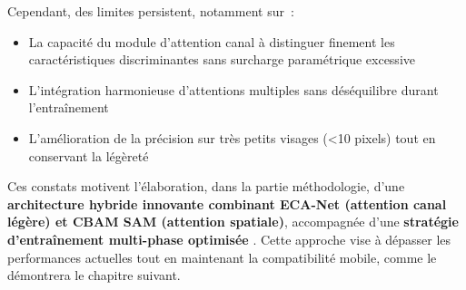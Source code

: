 \begin{onehalfspace}
\hspace{0.65 cm}Cependant, des limites persistent, notamment sur~:
\begin{itemize}
\item La capacité du module d'attention canal à distinguer finement les caractéristiques discriminantes sans surcharge paramétrique excessive
\item L'intégration harmonieuse d'attentions multiples sans déséquilibre durant l'entraînement
\item L'amélioration de la précision sur très petits visages (<10 pixels) tout en conservant la légèreté
\end{itemize}

\hspace{0.65 cm}Ces constats motivent l'élaboration, dans la partie méthodologie, d'une \textbf{architecture hybride innovante combinant ECA-Net (attention canal légère) et CBAM SAM (attention spatiale)}, accompagnée d'une \textbf{stratégie d'entraînement multi-phase optimisée} \cite{Wang2024ECACBAM}. Cette approche vise à dépasser les performances actuelles tout en maintenant la compatibilité mobile, comme le démontrera le chapitre suivant.

\end{onehalfspace}
